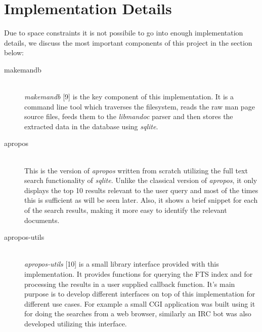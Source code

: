 \documentclass[titlepage, a4paper, 12pt]{article}
\begin{document}
\section{Implementation Details}
Due to space constraints it is not possibile to go into enough implementation details, we discuss 
the most important components of this project  in the section below:
\begin{description}
\item[makemandb] \hfill \\
\textit{makemandb} [9] is the key component of this implementation. It is a
command line tool which
traverses the filesystem, reads the raw man page source files, feeds them to the
\textit{libmandoc} parser and then stores the extracted data in the database
using \textit{sqlite}.
\end{description}
\begin{description}
\item[apropos] \hfill \\
This is the version of \textit{apropos} written from scratch utilizing the
full text search functionality of \textit{sqlite}. Unlike the classical version
of \textit{apropos}, it only displays the top 10 results relevant to the user
query and most of the times this is sufficient as will be seen later. Also, it
shows a brief snippet for each of the search results, making it more easy to
identify the relevant documents.
\end{description}
\begin{description}
\item[apropos-utils] \hfill \\
\textit{apropos-utils} [10] is a small library interface provided with this
implementation. It provides functions for querying the FTS index and for
processing the results in a user supplied callback function. It's main purpose
is to develop different interfaces on top of this implementation for different
use cases. For example a small CGI application was built using it for doing
the searches from a web browser, similarly an IRC bot was also developed utilizing this interface.
\end{description}
\end{document}
